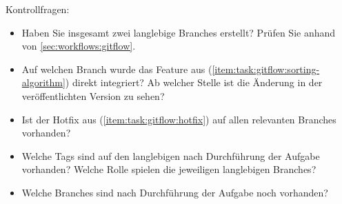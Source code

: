 Kontrollfragen:

\begin{itemize}
    \item Haben Sie insgesamt zwei langlebige Branches erstellt? Prüfen Sie anhand von \autoref{sec:workflows:gitflow}.
    
    \item Auf welchen Branch wurde das Feature aus (\ref{item:task:gitflow:sorting-algorithm}) direkt integriert? Ab welcher Stelle ist die Änderung in der veröffentlichten Version zu sehen?
    
    \item Ist der Hotfix aus (\ref{item:task:gitflow:hotfix}) auf allen relevanten Branches vorhanden?
    
    \item Welche Tags sind auf den langlebigen nach Durchführung der Aufgabe vorhanden? Welche Rolle spielen die jeweiligen langlebigen Branches?
    
    \item Welche Branches sind nach Durchführung der Aufgabe noch vorhanden?
\end{itemize}
